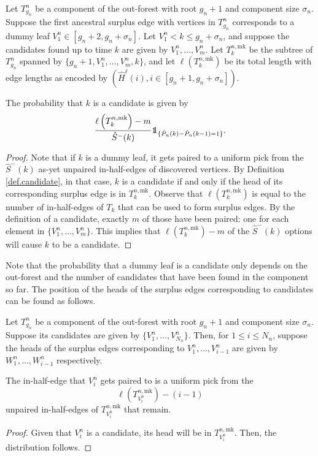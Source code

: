 Let $T^n_{g_n}$ be a component of the out-forest with root $g_n+1$ and component size $\sigma_n$. Suppose the first ancestral surplus edge with vertices in $T^n_{g_n}$ corresponds to a dummy leaf $V^n_1\in [g_n+2,g_n+\sigma_n]$. Let $V^n_1<k\leq g_n+\sigma_n$, and suppose the candidates found up to time $k$ are given by $V^n_1,\dots,V^n_m$. Let $T^{n,\mathrm{mk}}_k$ be the subtree of $T^n_{g_n}$ spanned by $\{g_n+1,V^n_1,\dots,V^n_m,k\}$, and let $\ell(T^{n,\mathrm{mk}}_k)$ be its total length with edge lengths as encoded by $(\hat{H}^\ell(i),i\in [g_n+1,g_n+\sigma_n])$.
\begin{proposition}
\label{prop:samplecandidates}
 The probability that $k$ is a candidate is given by 
$$\frac{\ell\left(T^{n,\mathrm{mk}}_k\right)-m}{\hat{S}^-(k)}\one_{\{\hat{P}_n(k)-\hat{P}_n(k-1)=1\}}.$$
\end{proposition}
\begin{proof}
Note that if $k$ is a dummy leaf, it gets paired to a uniform pick from the $\hat{S}^-(k)$ as-yet unpaired in-half-edges of discovered vertices. By Definition \ref{def.candidate}, in that case, $k$ is a candidate if and only if the head of its corresponding surplus edge is in $T^{n,\mathrm{mk}}_k$. Observe that $\ell\left(T^{n,\mathrm{mk}}_k\right)$ is equal to the number of in-half-edges of $T_{k}$ that can be used to form surplus edges. By the definition of a candidate, exactly $m$ of those have been paired: one for each element in $\{V^n_1,\dots,V^n_m\}$. This implies that $\ell\left(T^{n,\mathrm{mk}}_k\right)-m$ of the $\hat{S}^-(k)$ options will cause $k$ to be a candidate.
\end{proof}

Note that the probability that a dummy leaf is a candidate only depends on the out-forest and the number of candidates that have been found in the component so far. The position of the heads of the surplus edges corresponding to candidates can be found as follows.

Let $T^n_{g_n}$ be a component of the out-forest with root $g_n+1$ and component size $\sigma_n$. Suppose its candidates are given by $\{V^n_1,\dots,V^n_{N_n}\}$. Then, for $1\leq i\leq {N_n}$, suppose the heads of the surplus edges corresponding to $V^n_1,\dots,V^n_{i-1}$ are given by $W_1^n,\dots,W^n_{i-1}$ respectively. 
\begin{proposition}
\label{prop.sampleheadcandidates}
The in-half-edge that $V^n_{i}$ gets paired to is a uniform pick from the $$\ell\left(T^{n,\mathrm{mk}}_{V^n_i}\right)-(i-1)$$ unpaired in-half-edges of $T^{n,\mathrm{mk}}_{V^n_i}$ that remain.
\end{proposition}
\begin{proof}
Given that $V^n_{i}$ is a candidate, its head will be in $T^{n,\mathrm{mk}}_{V^n_i}$. Then, the distribution follows.
\end{proof}


